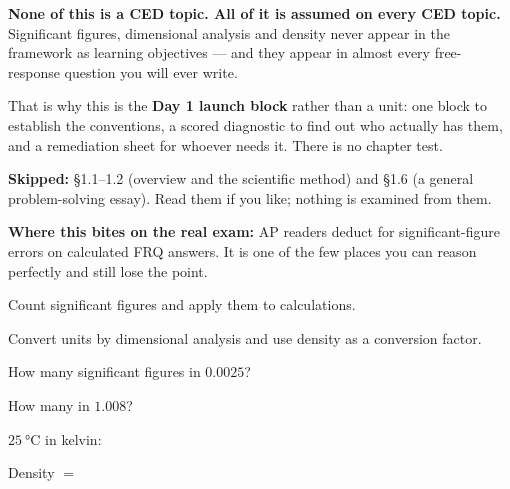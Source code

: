 \documentclass{apchem-notes}
\begin{document}
\apctitleblock

\begin{apcnote}
\textbf{None of this is a CED topic. All of it is assumed on every CED
topic.} Significant figures, dimensional analysis and density never appear
in the framework as learning objectives --- and they appear in almost every
free-response question you will ever write.

That is why this is the \textbf{Day 1 launch block} rather than a unit:
one block to establish the conventions, a scored diagnostic to find out who
actually has them, and a remediation sheet for whoever needs it. There is no
chapter test.

\textbf{Skipped:} \S1.1--1.2 (overview and the scientific method) and
\S1.6 (a general problem-solving essay). Read them if you like; nothing
is examined from them.

\textbf{Where this bites on the real exam:} AP readers deduct for
significant-figure errors on calculated FRQ answers. It is one of the few
places you can reason perfectly and still lose the point.
\end{apcnote}


\begin{objectives}
  \item Count significant figures and apply them to calculations.
  \item Convert units by dimensional analysis and use density as a
        conversion factor.
\end{objectives}


\begin{warmup}[4]
  \item How many significant figures in $0.0025$?
  \item How many in $1.008$? 
  \item $\SI{25}{\celsius}$ in kelvin: 
  \item Density $=$ 
\end{warmup}

\end{document}
